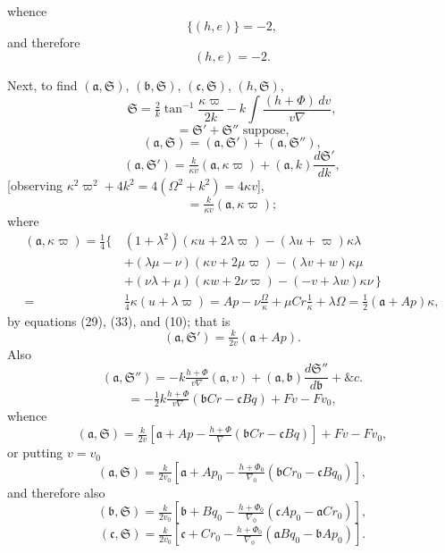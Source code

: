 \documentclass[11pt]{article}
\begin{document}
\newpage
\setcounter{page}{249}

whence
\[
\{(h, e)\} = -2,
\]
and therefore
\[
(h, e) = -2. \tag{52}
\]

Next, to find $(\mathfrak{a}, \mathfrak{S})$, $(\mathfrak{b}, \mathfrak{S})$, $(\mathfrak{c}, \mathfrak{S})$, $(h, \mathfrak{S})$,
\[
\mathfrak{S} = \tfrac{2}{k}\tan^{-1}\!\frac{\kappa\varpi}{2k} - k\!\int\!\frac{(h + \Phi)\,dv}{v\nabla},
\]
\[
= \mathfrak{S}' + \mathfrak{S}'' \text{ suppose,}
\]
\[
(\mathfrak{a}, \mathfrak{S}) = (\mathfrak{a}, \mathfrak{S}') + (\mathfrak{a}, \mathfrak{S}''),
\]
\[
(\mathfrak{a}, \mathfrak{S}') = \tfrac{k}{\kappa v}(\mathfrak{a}, \kappa\varpi) + (\mathfrak{a}, k)\frac{d\mathfrak{S}'}{dk},
\]
[observing $\kappa^2\varpi^2 + 4k^2 = 4(\Omega^2 + k^2) = 4\kappa v$],
\[
= \tfrac{k}{\kappa v}(\mathfrak{a}, \kappa\varpi);
\]
where
\begin{align*}
(\mathfrak{a}, \kappa\varpi) = \tfrac{1}{4}\big\{\, & (1 + \lambda^2)(\kappa u + 2\lambda\varpi) - (\lambda u + \varpi)\kappa\lambda \\
& + (\lambda\mu - \nu)(\kappa v + 2\mu\varpi) - (\lambda v + w)\kappa\mu \\
& + (\nu\lambda + \mu)(\kappa w + 2\nu\varpi) - (-v + \lambda w)\kappa\nu\,\big\} \\
= {}&\tfrac{1}{4}\kappa(u + \lambda\varpi) = Ap - \nu\tfrac{\Omega}{\kappa} + \mu Cr\tfrac{1}{\kappa} + \lambda\Omega = \tfrac{1}{2}(\mathfrak{a} + Ap)\kappa, \tag{53}
\end{align*}
by equations (29), (33), and (10);
that is
\[
(\mathfrak{a}, \mathfrak{S}') = \tfrac{k}{2v}(\mathfrak{a} + Ap).
\]
Also
\[
(\mathfrak{a}, \mathfrak{S}'') = -k\tfrac{h + \Phi}{v\nabla}(\mathfrak{a}, v) + (\mathfrak{a}, \mathfrak{b})\frac{d\mathfrak{S}''}{d\mathfrak{b}} + \&c.
\]
\[
= -\tfrac{1}{2}k\tfrac{h + \Phi}{v\nabla}(\mathfrak{b}Cr - \mathfrak{c}Bq) + Fv - Fv_0,
\]
whence
\[
(\mathfrak{a}, \mathfrak{S}) = \tfrac{k}{2v}\!\left[\mathfrak{a} + Ap - \tfrac{h + \Phi}{\nabla}(\mathfrak{b}Cr - \mathfrak{c}Bq)\right] + Fv - Fv_0,
\]
or putting $v = v_0$
\[
(\mathfrak{a}, \mathfrak{S}) = \tfrac{k}{2v_0}\!\left[\mathfrak{a} + Ap_0 - \tfrac{h + \Phi_0}{\nabla_0}(\mathfrak{b}Cr_0 - \mathfrak{c}Bq_0)\right], \tag{54}
\]
and therefore also
\[
(\mathfrak{b}, \mathfrak{S}) = \tfrac{k}{2v_0}\!\left[\mathfrak{b} + Bq_0 - \tfrac{h + \Phi_0}{\nabla_0}(\mathfrak{c}Ap_0 - \mathfrak{a}Cr_0)\right],
\]
\[
(\mathfrak{c}, \mathfrak{S}) = \tfrac{k}{2v_0}\!\left[\mathfrak{c} + Cr_0 - \tfrac{h + \Phi_0}{\nabla_0}(\mathfrak{a}Bq_0 - \mathfrak{b}Ap_0)\right].
\]
\end{document}
